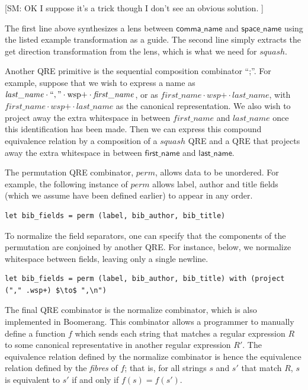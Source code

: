\documentclass[acmsmall,review,anonymous]{acmart}
\newcommand{\FINISH}[3]{\ifdraft\textcolor{#1}{[#2: #3]}\fi}
\newcommand{\sam}[1]{\FINISH{dkpurple}{SM}{#1}}
\newcommand{\kw}[1]{\ensuremath{\mathit{#1}}}
\newcommand{\codefont}[1]{\ensuremath{\mathsf{#1}}}
\begin{document}
\sam{OK I suppose it's a trick though I don't see an obvious solution. }

The first line above synthesizes a lens between \codefont{comma\_name} and
\codefont{space\_name} using the listed example transformation as a guide.  The
second line simply extracts the get direction transformation from the lens,
which is what we need for \kw{squash}.

Another QRE primitive is the sequential composition combinator ``;''.  For
example, suppose that we wish to express a name as $\kw{last\_name \cdot
``,\text{''} \cdot \text{wsp+} \cdot first\_name}$, or as $\kw{first\_name\cdot
\text{wsp+} \cdot last\_name}$, with $\kw{first\_name\cdot \text{wsp+} \cdot
last\_name}$ as the canonical representation. We also wish to project away the
extra whitespace in between \kw{first\_name} and \kw{last\_name} once this
identification has been made. Then we can express this compound equivalence
relation by a composition of a \kw{squash} QRE and a QRE that projects away
the extra whitespace in between \codefont{first\_name} and
\codefont{last\_name}.

The permutation QRE combinator, \kw{perm}, allows data to be unordered. For example,
the following instance of \kw{perm} allows label, author and title fields
(which we assume have been defined earlier) to appear in any order.
%
\begin{lstlisting}
let bib_fields = perm (label, bib_author, bib_title)
\end{lstlisting}
%
To normalize the field separators, one can specify that the components of the
permutation are conjoined by another QRE. For instance, below, we normalize
whitespace between fields, leaving only a single newline.
%
\begin{lstlisting}
let bib_fields = perm (label, bib_author, bib_title) with (project ("," .wsp+) $\to$ ",\n")
\end{lstlisting}

The final QRE combinator is the normalize combinator, which is also implemented
in Boomerang. This combinator allows a programmer to manually define a function
$f$ which sends each string that matches a regular expression $R$ to some
canonical representative in another regular expression $R'$. The equivalence
relation defined by the normalize combinator is hence the equivalence relation
defined by the {\em fibres} of $f$; that is, for all strings $s$ and $s'$ that
match $R$, $s$ is equivalent to $s'$ if and only if $f(s) = f(s')$.
\end{document}
